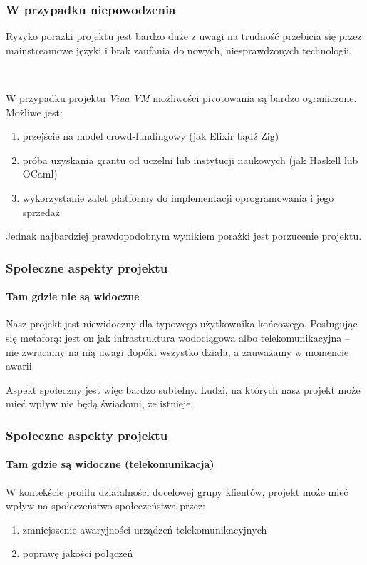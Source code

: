 \documentclass[aspectratio=169]{beamer}
\begin{document}
\begin{frame}
    \frametitle{W przypadku niepowodzenia}

    Ryzyko porażki projektu jest bardzo duże z uwagi na trudność przebicia się
    przez mainstreamowe języki i brak zaufania do nowych, niesprawdzonych
    technologii.

    ~

    W przypadku projektu \emph{Viua VM} możliwości pivotowania są bardzo
    ograniczone. Możliwe jest:

    \begin{enumerate}
        \item przejście na model crowd-fundingowy (jak Elixir bądź Zig)
        \item próba uzyskania grantu od uczelni lub instytucji naukowych (jak
            Haskell lub OCaml)
        \item wykorzystanie zalet platformy do implementacji oprogramowania i
            jego sprzedaż
    \end{enumerate}
    Jednak najbardziej prawdopodobnym wynikiem porażki jest porzucenie projektu.
\end{frame}

\begin{frame}
    \frametitle{Społeczne aspekty projektu}
    \framesubtitle{Tam gdzie nie są widoczne}

    Nasz projekt jest niewidoczny dla typowego użytkownika końcowego.
    Posługując się metaforą: jest on jak infrastruktura wodociągowa albo
    telekomunikacyjna -- nie zwracamy na nią uwagi dopóki wszystko działa, a
    zauważamy w momencie awarii.

    \vspace{0.5cm}

    Aspekt społeczny jest więc bardzo subtelny. Ludzi, na których nasz projekt
    może mieć wpływ nie będą świadomi, że istnieje.
\end{frame}

\begin{frame}
    \frametitle{Społeczne aspekty projektu}
    \framesubtitle{Tam gdzie są widoczne (telekomunikacja)}

    W kontekście profilu działalności docelowej grupy klientów, projekt może
    mieć wpływ na społeczeństwo społeczeństwa przez:

    \begin{enumerate}
        \item zmniejszenie awaryjności urządzeń telekomunikacyjnych
        \item poprawę jakości połączeń
    \end{enumerate}
\end{frame}
\end{document}
